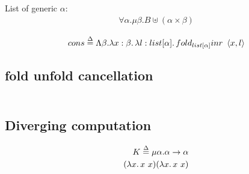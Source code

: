 \documentclass{article}
\begin{document}
List of generic $\alpha$:
\begin{align*}
    \forall\alpha.\mu\beta.B\uplus(\alpha\times\beta)
\end{align*}


\begin{align*}
    cons \overset\Delta= \Lambda\beta.\lambda x:\beta\ldotp \lambda l:list[\alpha]\ldotp fold_{list[\alpha]}{inr}~\left\langle x, l\right\rangle
\end{align*}

\subsection{fold unfold cancellation}
\begin{gather*}
\end{gather*}

\subsection{Diverging computation}
\begin{align*}
    K \overset\Delta= \mu\alpha.\alpha\to\alpha \\
    (\lambda x\ldotp x\ x)(\lambda x\ldotp x\ x) \\
\end{align*}
\end{document}
